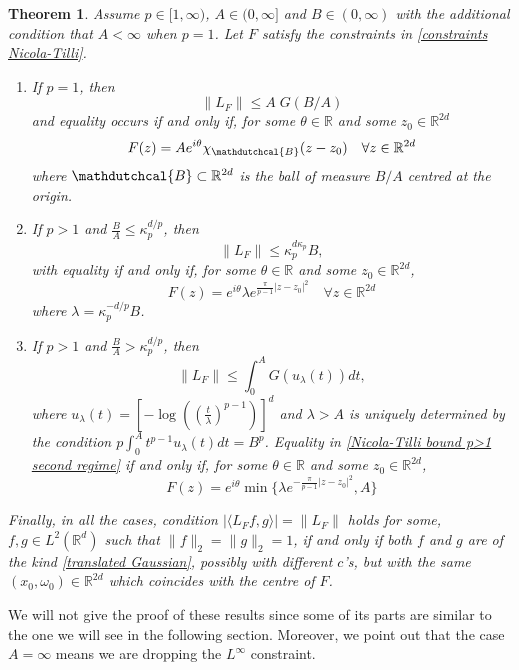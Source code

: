 \documentclass[corpo=11pt, stile=classica, tipotesi=custom,
greek, evenboxes, english]{toptesi}
\numberwithin{equation}{chapter}
\newtheorem{teo}{Theorem}[chapter] %
\theoremstyle{remark}
\newcommand{\R}{\mathbb{R}} %
\begin{document}
\begin{teo}\label{Nicola Tilli norm theorem}
	Assume $p \in [1,\infty)$, $A \in (0, \infty]$ and $B \in (0,\infty)$ with the additional condition that $A < \infty$ when $p=1$. Let $F$ satisfy the constraints in \eqref{constraints Nicola-Tilli}.
	\begin{enumerate}[label=(\roman*)]
		\item If $p=1$, then
		\begin{equation}\label{Nicola-Tilli bound p=1}
			\|L_F\| \leq A\;G(B/A)
		\end{equation}
		and equality occurs if and only if, for some $\theta \in \R$ and some $z_0 \in \R^{2d}$
		\begin{equation}\label{Nicola-Tilli maximal function p=1}
			F(z) = A e^{i\theta} \chi_{\mathdutchcal{B}} (z-z_0) \quad \forall z \in \R^{2d}
		\end{equation}
		where $\mathdutchcal{B} \subset \R^{2d}$ is the ball of measure $B/A$ centred at the origin.
		
		\item If $p>1$ and $\frac{B}{A} \leq \kappa_p^{d/p}$, then
		\begin{equation}\label{Nicola-Tilli bound p>1 first regime}
			\|L_F\| \leq \kappa_p^{d \kappa_p}B,
		\end{equation}
		with equality if and only if, for some $\theta \in \R$ and some $z_0 \in \R^{2d}$,
		\begin{equation}\label{Nicola-Tilli maximal function p>1 first regime}
			F(z) = e^{i \theta} \lambda e^{\frac{\pi}{p-1}|z-z_0|^2} \quad \forall z \in \R^{2d}
		\end{equation}
		where $\lambda = \kappa_p^{-d/p}B$.\label{Nicola-Tilli norm theorem case 2}	
		\item If $p>1$ and $\frac{B}{A} > \kappa_p^{d/p}$, then
		\begin{equation}\label{Nicola-Tilli bound p>1 second regime}
			\|L_F\| \leq \int_{0}^{A} G(u_{\lambda}(t))dt,
		\end{equation}
		where $u_{\lambda}(t) = \left[-\log\left(\left(\frac{t}{\lambda}\right)^{p-1}\right) \right]^d$ and $\lambda>A$ is uniquely determined by the condition $p\int_{0}^{A} t^{p-1}u_{\lambda}(t)dt = B^p$. Equality in \eqref{Nicola-Tilli bound p>1 second regime} if and only if, for some $\theta \in \R$ and some $z_0 \in \R^{2d}$,
		\begin{equation}\label{Nicola-Tilli maximal function p>1 second regime}
			F(z) = e^{i\theta} \min \{ \lambda e^{-\frac{\pi}{p-1}|z-z_0|^2}, A \}
		\end{equation}
	\end{enumerate}
	Finally, in all the cases, condition $|\langle L_F f,g \rangle| = \|L_F\|$ holds for some, $f,g \in L^2(\R^d)$ such that $\|f\|_2 = \|g\|_2 = 1$, if and only if both $f$ and $g$ are of the kind \eqref{translated Gaussian}, possibly with different $c$'s, but with the same $(x_0,\omega_0) \in \R^{2d}$ which coincides with the centre of $F$.
\end{teo}
We will not give the proof of these results since some of its parts are similar to the one we will see in the following section. Moreover, we point out that the case $A=
\infty$ means we are dropping the $L^{\infty}$ constraint.
\end{document}
